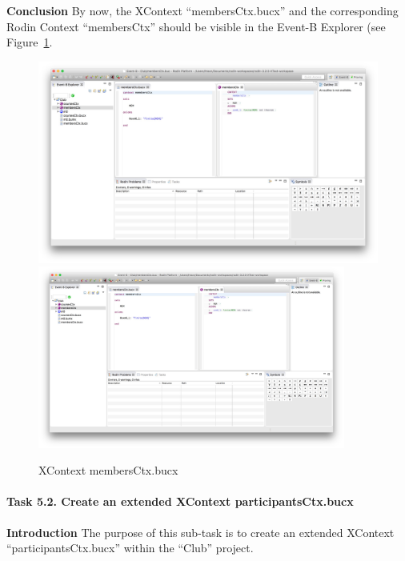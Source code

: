 \textbf{Conclusion} By now, the XContext ``membersCtx.bucx'' and the corresponding Rodin Context ``membersCtx'' should be visible in the Event-B Explorer (see Figure~\ref{fig:membersCtx}.
  \begin{figure}[!htbp]
    \centering
    \ifplastex
    \includegraphics[width=512]{figures/MembersCtx}
    \else
    \includegraphics[width=0.9\textwidth]{figures/MembersCtx}
    \fi
    \caption{XContext membersCtx.bucx}
    \label{fig:membersCtx}
  \end{figure}
\paragraph{Task 5.2. Create an extended XContext participantsCtx.bucx}
\textbf{Introduction} The purpose of this sub-task is to create an extended XContext ``participantsCtx.bucx'' within the ``Club'' project.

